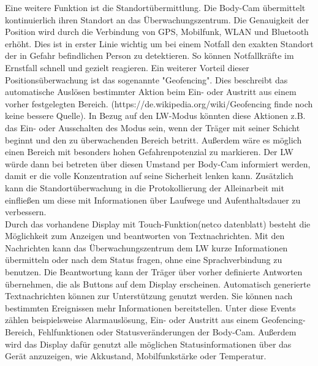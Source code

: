 \documentclass[thesis.tex]{subfiles}
\begin{document}
Eine weitere Funktion ist die Standortübermittlung.
Die Body-Cam übermittelt kontinuierlich ihren Standort an das Überwachungszentrum.
Die Genauigkeit der Position wird durch die Verbindung von GPS, Mobilfunk, WLAN und Bluetooth erhöht.
Dies ist in erster Linie wichtig um bei einem Notfall den exakten Standort der in Gefahr befindlichen Person zu detektieren.
So können Notfallkräfte im Ernstfall schnell und gezielt reagieren.
Ein weiterer Vorteil dieser Positionsüberwachung ist das sogenannte "Geofencing".
Dies beschreibt das automatische Auslösen bestimmter Aktion beim Ein- oder Austritt aus einem vorher festgelegten Bereich.
(https://de.wikipedia.org/wiki/Geofencing finde noch keine bessere Quelle).
In Bezug auf den LW-Modus könnten diese Aktionen z.B. das Ein- oder Ausschalten des Modus sein, wenn der Träger mit seiner Schicht beginnt und den zu überwachenden Bereich betritt.
Außerdem wäre es möglich einen Bereich mit besonders hohen Gefahrenpotenzial zu markieren.
Der LW würde dann bei betreten über diesen Umstand per Body-Cam informiert werden, damit er die volle Konzentration auf seine Sicherheit lenken kann.
Zusätzlich kann die Standortüberwachung in die Protokollierung der Alleinarbeit mit einfließen um diese mit Informationen über Laufwege und Aufenthaltsdauer zu verbessern.
\\

Durch das vorhandene Display mit Touch-Funktion(netco datenblatt) besteht die Möglichkeit zum Anzeigen und beantworten von Textnachrichten.
Mit den Nachrichten kann das Überwachungszentrum dem LW kurze Informationen übermitteln oder nach dem Status fragen, ohne eine Sprachverbindung zu benutzen.
Die Beantwortung kann der Träger über vorher definierte Antworten übernehmen, die als Buttons auf dem Display erscheinen.
Automatisch generierte Textnachrichten können zur Unterstützung genutzt werden.
Sie können nach bestimmten Ereignissen mehr Informationen bereitstellen.
Unter diese Events zählen beispielsweise Alarmauslösung, Ein- oder Austritt aus einem Geofencing-Bereich, Fehlfunktionen oder Statusveränderungen der Body-Cam.
Außerdem wird das Display dafür genutzt alle möglichen Statusinformationen über das Gerät anzuzeigen, wie Akkustand, Mobilfunkstärke oder Temperatur.
\\
\end{document}
